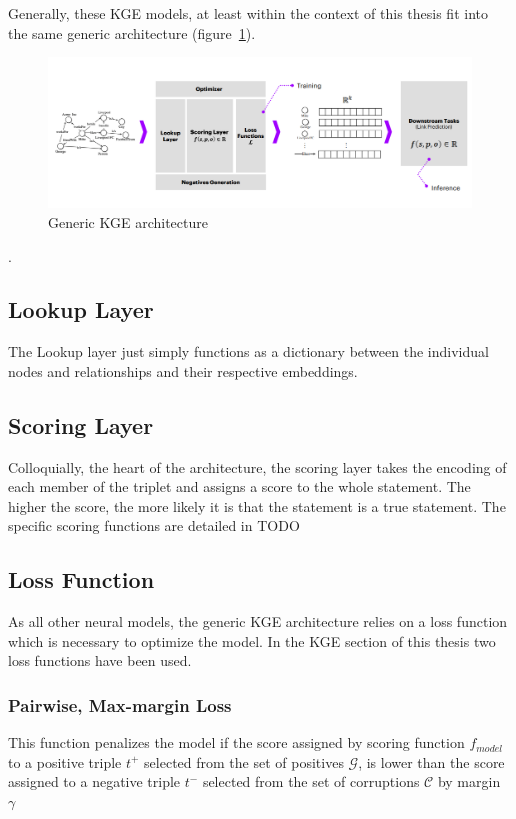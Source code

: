 Generally, these KGE models, at least within the context of this thesis fit into the same generic architecture (figure~\ref{fig:kge-architecture}).

\begin{figure}[h] %
    \centering %
    \includegraphics[width=1\linewidth]{figures/kge-architecture} %
    \caption{Generic KGE architecture~\cite{KGETutorial}} %
    \label{fig:kge-architecture} %
\end{figure}.

\subsection{Lookup Layer}
The Lookup layer just simply functions as a dictionary between the individual nodes and relationships and their respective embeddings.
\subsection{Scoring Layer}
Colloquially, the heart of the architecture, the scoring layer takes the encoding of each member of the triplet
and assigns a score to the whole statement.
The higher the score, the more likely it is that the statement is a true statement.
The specific scoring functions are detailed in TODO

\subsection{Loss Function}
As all other neural models, the generic KGE architecture relies on a loss function which is necessary to optimize the model.
In the KGE section of this thesis two loss functions have been used.

\subsubsection{Pairwise, Max-margin Loss}
This function penalizes the model if the score assigned by scoring function $f_{model}$
to a positive triple $t^+$ selected from the set of positives $\mathcal{G}$, is lower than the score assigned to a
negative triple $t^-$ selected from the set of corruptions $\mathcal{C}$
by margin $\gamma$


